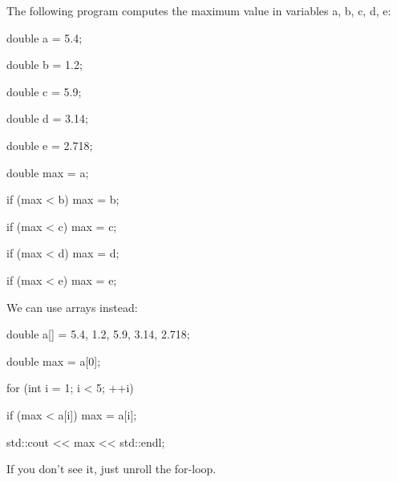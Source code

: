 The following program computes the maximum value in variables a, b, c, d, e:



\begin{consolethree}[escapeinside=||]double a = 5.4;

double b = 1.2;

double c = 5.9;

double d = 3.14;

double e = 2.718;



double max = a;

if (max < b) max = b;

if (max < c) max = c;

if (max < d) max = d;

if (max < e) max = e; 

\end{consolethree}



We can use arrays instead:



\begin{consolethree}[escapeinside=||]

double a[] = {5.4, 1.2, 5.9, 3.14, 2.718};



double max = a[0];



for (int i = 1; i < 5; ++i)

{



    if (max < a[i]) max = a[i];

    {

        std::cout << max << std::endl;

    }

}

\end{consolethree}



If you don't see it, just unroll the for-loop.


